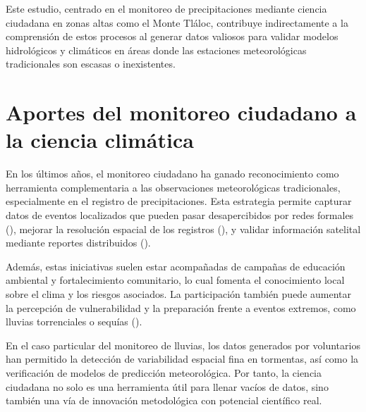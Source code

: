 Este estudio, centrado en el monitoreo de precipitaciones mediante ciencia ciudadana en zonas altas como el Monte Tláloc, contribuye indirectamente a la comprensión de estos procesos al generar datos valiosos para validar modelos hidrológicos y climáticos en áreas donde las estaciones meteorológicas tradicionales son escasas o inexistentes.


\section{Aportes del monitoreo ciudadano a la ciencia climática}

En los últimos años, el monitoreo ciudadano ha ganado reconocimiento como herramienta complementaria a las observaciones meteorológicas tradicionales, especialmente en el registro de precipitaciones. Esta estrategia permite capturar datos de eventos localizados que pueden pasar desapercibidos por redes formales  (\cite{viegas2023citizen}), mejorar la resolución espacial de los registros  (\cite{elmore2014mping}), y validar información satelital mediante reportes distribuidos  (\cite{lei2022combining}).

Además, estas iniciativas suelen estar acompañadas de campañas de educación ambiental y fortalecimiento comunitario, lo cual fomenta el conocimiento local sobre el clima y los riesgos asociados. La participación también puede aumentar la percepción de vulnerabilidad y la preparación frente a eventos extremos, como lluvias torrenciales o sequías  (\cite{okada2019community}).

En el caso particular del monitoreo de lluvias, los datos generados por voluntarios han permitido la detección de variabilidad espacial fina en tormentas, así como la verificación de modelos de predicción meteorológica. Por tanto, la ciencia ciudadana no solo es una herramienta útil para llenar vacíos de datos, sino también una vía de innovación metodológica con potencial científico real.

